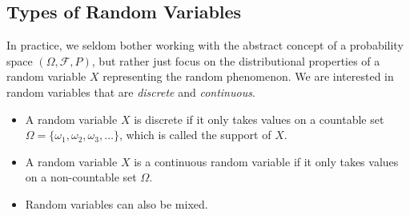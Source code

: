 \documentclass{tufte-handout}
\begin{document}
\subsection{Types of Random Variables}
In practice, we seldom bother working with the abstract concept of a probability space $(\Omega,\mathscr F, P)$, but rather just focus on the distributional properties of a random variable $X$ representing the random phenomenon. We are interested in random variables that are {\em discrete} and {\em continuous}.
\begin{itemize}
\item A random variable $X$ is discrete if it only takes values on a countable set $\Omega = \{\omega_1,\omega_2,\omega_3,\dots\}$, which is called the support of $X$. 
\item A random variable $X$ is a continuous random variable if it only takes values on a non-countable set $\Omega$.
\item  Random variables can also be mixed.
\end{itemize}
\end{document}
